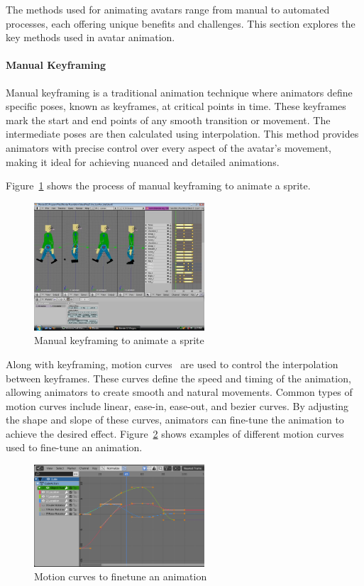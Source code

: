 \documentclass[../../main.tex]{subfiles}
\begin{document}
The methods used for animating avatars range from manual to automated processes, each offering unique benefits and challenges. This section explores the key methods used in avatar animation.

\paragraph{Manual Keyframing}
\label{ch:background_work:sign_language_synthesis:3d_techniques:avatar_animation:manual_keyframing}

Manual keyframing is a traditional animation technique where animators define specific poses, known as keyframes, at critical points in time. These keyframes mark the start and end points of any smooth transition or movement. The intermediate poses are then calculated using interpolation. This method provides animators with precise control over every aspect of the avatar’s movement, making it ideal for achieving nuanced and detailed animations.

Figure~\ref{fig:keyframing} shows the process of manual keyframing to animate a sprite.

\begin{figure} 
  \centering \includegraphics[width = 2.5in]{chapters/background_work/images/keyframing.png} 
  \caption{Manual keyframing to animate a sprite} 
  \label{fig:keyframing} 
\end{figure}

Along with keyframing, motion curves~\cite{10.1145/218380.218422} are used to control the interpolation between keyframes. These curves define the speed and timing of the animation, allowing animators to create smooth and natural movements. Common types of motion curves include linear, ease-in, ease-out, and bezier curves. By adjusting the shape and slope of these curves, animators can fine-tune the animation to achieve the desired effect. Figure~\ref{fig:motion_curves} shows examples of different motion curves used to fine-tune an animation.

\begin{figure} 
  \centering \includegraphics[width = 2.5in]{chapters/background_work/images/motion_curves.png} 
  \caption{Motion curves to finetune an animation} 
  \label{fig:motion_curves} 
\end{figure}
\end{document}

